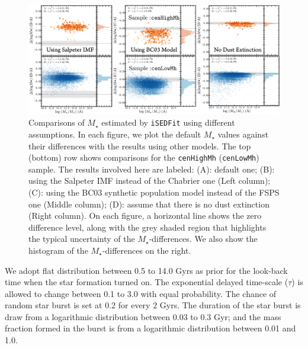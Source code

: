 \documentclass{emulateapj}
\def\rbcg{\texttt{cenHighMh}}
\def\nbcg{\texttt{cenLowMh}}
\def\mstar{{$M_{\star}$}}
\begin{document}
\begin{CJK*}{UTF8}{gbsn}
    \begin{figure}[hbt!]
        \begin{center}
        \includegraphics[width=\textwidth]{fig/redbcg_isedfit_3.pdf}
        \caption{Comparisons of \mstar{} estimated by \texttt{iSEDFit} using different
            assumptions. 
            In each figure, we plot the default \mstar{} values against their 
            differences with the results using other models. 
            The top (bottom) row shows comparisons for the \rbcg{} (\nbcg{}) sample. 
            The results involved here are labeled: 
            (A): default one; 
            (B): using the Salpeter IMF instead of the Chabrier one (Left column);
            (C): using the BC03 synthetic population model instead of the FSPS one
                 (Middle column);
            (D): assume that there is no dust extinction (Right column). 
            On each figure, a horizontal line shows the zero difference level, along
            with the grey shaded region that highlights the typical uncertainty of 
            the \mstar{}-differences. 
            We also show the histogram of the \mstar{}-differences on the right.}
        \label{fig:ised_3}
        \end{center}
    \end{figure}

    We adopt flat distribution between 0.5 to 14.0 Gyrs as prior for the look-back 
    time when the star formation turned on. 
    The exponential delayed time-scale ($\tau$) is allowed to change between 
    0.1 to 3.0 with equal probability.  
    The chance of random star burst is set at 0.2 for every 2 Gyrs. 
    The duration of the star burst is draw from a logarithmic distribution 
    between 0.03 to 0.3 Gyr; and the mass fraction formed in the burst is from 
    a logarithmic distribution between 0.01 and 1.0.  


\end{CJK*}
\end{document}
